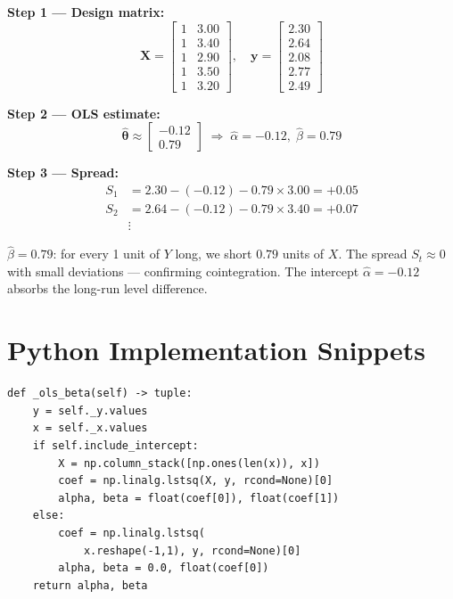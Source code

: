 \documentclass[10pt,a4paper,twocolumn]{article}
\begin{document}
\noindent\textbf{Step 1 --- Design matrix:}
\[
  \mathbf{X} = \begin{bmatrix}
    1 & 3.00\\ 1 & 3.40\\ 1 & 2.90\\ 1 & 3.50\\ 1 & 3.20
  \end{bmatrix},\quad
  \mathbf{y} = \begin{bmatrix}2.30\\2.64\\2.08\\2.77\\2.49\end{bmatrix}
\]

\noindent\textbf{Step 2 --- OLS estimate:}
\[
  \hat{\boldsymbol\theta} \approx \begin{bmatrix}-0.12\\0.79\end{bmatrix}
  \;\Rightarrow\; \hat\alpha=-0.12,\;\hat\beta=0.79
\]

\noindent\textbf{Step 3 --- Spread:}
\begin{align*}
  S_1 &= 2.30 - (-0.12) - 0.79\times3.00 = +0.05\\
  S_2 &= 2.64 - (-0.12) - 0.79\times3.40 = +0.07\\
  &\vdots
\end{align*}

\begin{tcolorbox}[resultbox={Interpretation}]
$\hat\beta = 0.79$: for every 1 unit of $Y$ long, we short $0.79$ units
of $X$.  The spread $S_t \approx 0$ with small deviations --- confirming
cointegration.  The intercept $\hat\alpha=-0.12$ absorbs the long-run
level difference.
\end{tcolorbox}

\section{Python Implementation Snippets}

\begin{tcolorbox}[codebox={OLS beta estimation}]
\begin{lstlisting}[style=pythonplain]
def _ols_beta(self) -> tuple:
    y = self._y.values
    x = self._x.values
    if self.include_intercept:
        X = np.column_stack([np.ones(len(x)), x])
        coef = np.linalg.lstsq(X, y, rcond=None)[0]
        alpha, beta = float(coef[0]), float(coef[1])
    else:
        coef = np.linalg.lstsq(
            x.reshape(-1,1), y, rcond=None)[0]
        alpha, beta = 0.0, float(coef[0])
    return alpha, beta
\end{lstlisting}
\end{tcolorbox}
\end{document}
